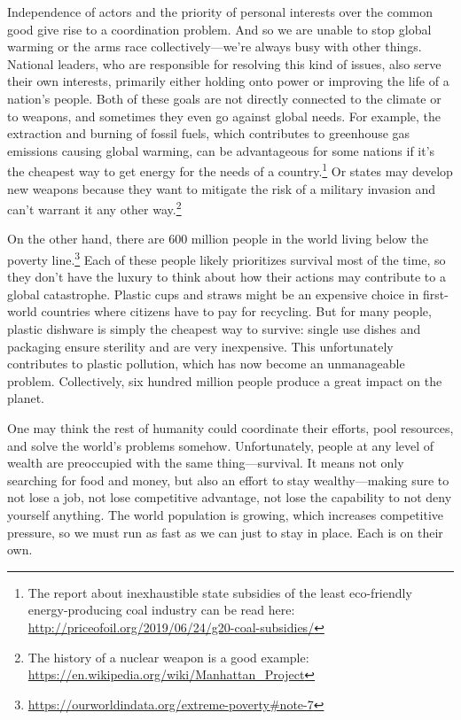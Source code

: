 \documentclass[12pt]{report}
\begin{document}
\noindent Independence of actors and the priority of personal interests over the common good give rise to a coordination problem. And so we are unable to stop global warming or the arms race collectively\thinspace---\thinspace we’re always busy with other things. National leaders, who are responsible for resolving this kind of issues, also serve their own interests, primarily either holding onto power or improving the life of a nation’s people. Both of these goals are not directly connected to the climate or to weapons, and sometimes they even go against global needs. For example, the extraction and burning of fossil fuels, which contributes to greenhouse gas emissions causing global warming, can be advantageous for some nations if it’s the cheapest way to get energy for the needs of a country.\footnote{The report about inexhaustible state subsidies of the least eco-friendly energy-producing coal industry can be read here: \url{http://priceofoil.org/2019/06/24/g20-coal-subsidies/}} Or states may develop new weapons because they want to mitigate the risk of a military invasion and can’t warrant it any other way.\footnote{The history of a nuclear weapon is a good example: \url{https://en.wikipedia.org/wiki/Manhattan_Project}}

\noindent On the other hand, there are 600 million people in the world living below the poverty line.\footnote{\url{https://ourworldindata.org/extreme-poverty\#note-7}} Each of these people likely prioritizes survival most of the time, so they don’t have the luxury to think about how their actions may contribute to a global catastrophe. Plastic cups and straws might be an expensive choice in first-world countries where citizens have to pay for recycling. But for many people, plastic dishware is simply the cheapest way to survive: single use dishes and packaging ensure sterility and are very inexpensive. This unfortunately contributes to plastic pollution, which has now become an unmanageable problem. Collectively, six hundred million people produce a great impact on the planet.

\noindent One may think the rest of humanity could coordinate their efforts, pool resources, and solve the world’s problems somehow. Unfortunately, people at any level of wealth are preoccupied with the same thing\thinspace---\thinspace survival. It means not only searching for food and money, but also an effort to stay wealthy\thinspace---\thinspace making sure to not lose a job, not lose competitive advantage, not lose the capability to not deny yourself anything. The world population is growing, which increases competitive pressure, so we must run as fast as we can just to stay in place. Each is on their own.
\end{document}
